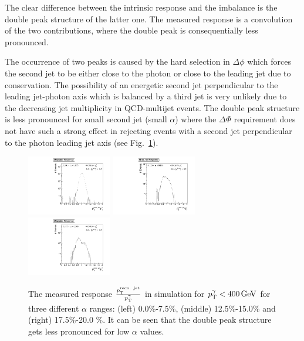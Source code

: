 The clear difference between the intrinsic response and the imbalance is the double peak structure of the latter one. The measured response is a convolution of the two
contributions, where the double peak is consequentially less pronounced.

The occurrence of two peaks is caused by the hard selection in $\Delta \phi$ which forces the second jet to be either close to the photon or close to the leading jet 
due to \pt conservation. 
The possibility of an energetic second jet perpendicular to the leading jet-photon axis which is balanced by a third jet is very unlikely 
due to the decreasing jet multiplicity in QCD-multijet events.
The double peak structure is less pronounced for small second jet \pt (small $\alpha$) where the $\Delta \Phi$ requirement does not have such a strong effect in rejecting
events with a second jet perpendicular to the photon leading jet axis (see \mbox{Fig. \ref{fig:alphaBins}}).

\begin{figure}[bt]
 \centering
     \includegraphics[width=0.33\textwidth]{figures/resolution/methodology/fullResponseExample1stBin.pdf}
     \includegraphics[width=0.33\textwidth]{figures/resolution/methodology/fullResponseExample4thBin.pdf}
     \includegraphics[width=0.33\textwidth]{figures/resolution/methodology/fullResponseExample6thBin.pdf}
  \caption{The measured response $\frac{p_{\text{T}}^{\text{reco. jet}}}{p_{\text{T}}^{\gamma}}$ in simulation for $p_{\text{T}}^{\gamma} < 400 \,\text{Ge}\kern-0.06667em\text{V}$ for three different $\alpha$ ranges: 
           (left) 0.0\%-7.5\%, (middle) 12.5\%-15.0\% and (right) 17.5\%-20.0 \%. 
           It can be seen that the double peak structure gets less pronounced for low $\alpha$ values.}  
 \label{fig:alphaBins}
\end{figure}

